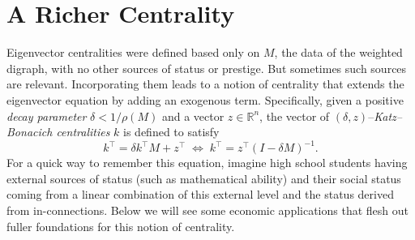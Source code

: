 \documentclass{notices}
\theoremstyle{definition}\newtheorem{problem}{Problem}
\theoremstyle{definition} \newtheorem{remark}{Remark}
\theoremstyle{definition} \newtheorem{claim}{Claim}
\theoremstyle{definition} \newtheorem{thm}{Theorem}
\theoremstyle{definition} \newtheorem*{thmNoNum}{Theorem}
\theoremstyle{definition} \newtheorem{definition}{Definition}
\theoremstyle{definition} \theoremstyle{remark}
\theoremstyle{definition} \newtheorem{note}{Note}
\theoremstyle{definition} \newtheorem{notation}{Notation}
\theoremstyle{definition} \theoremstyle{plain}
\theoremstyle{definition} \newtheorem{condition}{Condition}
\theoremstyle{definition} \newtheorem{lem}{Lemma}
\theoremstyle{definition} \newtheorem{corollary}{Corollary}
\theoremstyle{definition} \newtheorem{prop}{Proposition}
\theoremstyle{definition} \newtheorem{ax}{Axiom}
\theoremstyle{definition} \newtheorem{assumption}{Assumption}
\theoremstyle{definition} \newtheorem{example}{Example}
\theoremstyle{definition} \newtheorem{rmk}{Remark}
\theoremstyle{definition} \newtheorem{res}{Result}
\theoremstyle{definition} \newtheorem{que}{Question}
\theoremstyle{definition} \newtheorem{conjecture}{Conjecture}
\theoremstyle{definition}
\begin{document}
\section*{A Richer Centrality}



Eigenvector centralities were defined based only on $M$, the data of the weighted digraph, with no other sources of status or prestige. But sometimes such sources are relevant. Incorporating them leads to a notion of centrality that extends the eigenvector equation by adding an exogenous term. Specifically, given a positive \emph{decay parameter} $\delta < 1/\rho(M)$ and a vector $z \in \mathbb{R}^n$, the vector of $(\delta,z)$--\emph{Katz--Bonacich centralities} $k$ is defined \cite{Jackson2008} to satisfy
\begin{equation} \label{eq:kb} k^\top = \delta k^\top M  + z^\top \; \Leftrightarrow \; k^\top = z^\top (I-\delta M)^{-1}. \end{equation}
For a quick way to remember this equation, imagine high school students having external sources of status (such as mathematical ability) and their social status coming from a linear combination of this external level and the status derived from in-connections. Below we will see some economic applications that flesh out fuller foundations for this notion of centrality.
\end{document}
